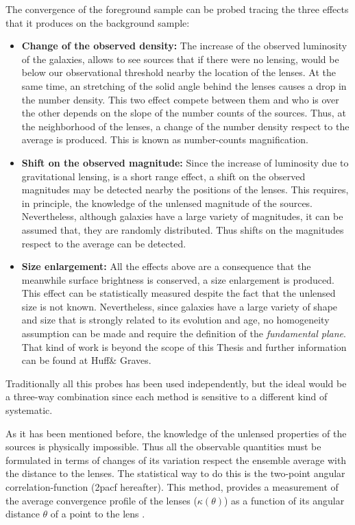 The convergence of the foreground sample can be probed tracing the three effects that it produces on the background sample:
\begin{itemize}
\item {\bf Change of the observed density:} The increase of the observed luminosity of the galaxies, allows to see sources that if there were no lensing, would be below our observational threshold nearby the location of the lenses. At the same time, an stretching of the solid angle behind the lenses causes a drop in the number density. This two effect compete between them and who is over the other depends on the slope of the number counts of the sources. Thus, at the neighborhood of the lenses, a change of the number density respect to the average is produced. This is known as number-counts magnification.
\item {\bf Shift on the observed magnitude:} Since the increase of luminosity due to gravitational lensing, is a short range effect, a shift on the observed magnitudes may be detected nearby the positions of the lenses. This requires, in principle, the knowledge of the unlensed magnitude of the sources. Nevertheless, although galaxies have a large variety of magnitudes, it can be assumed that, they are randomly distributed. Thus shifts on the magnitudes respect to the average can be detected.
\item {\bf Size enlargement:} All the effects above are a consequence that the meanwhile surface brightness is conserved, a size enlargement is produced. This effect can be statistically measured despite the fact that the unlensed size is not known. Nevertheless, since galaxies have a large variety of shape and size that is strongly related to its evolution and age, no homogeneity assumption can be made and require the definition of the {\it fundamental plane}. That kind of work is beyond the scope of this Thesis and further information can be found at Huff\& Graves.
\end{itemize}

Traditionally all this probes has been used independently, but the ideal would be a three-way combination since each method is sensitive to a different kind of systematic.
\newline

As it has been mentioned before, the knowledge of the unlensed properties of the sources is physically impossible. Thus all the observable quantities must be formulated in terms of changes of its variation respect the ensemble average with the distance to the lenses. The statistical way to do this is the two-point angular correlation-function (2pacf hereafter). This method, provides a measurement of the average convergence profile of the lenses ($\kappa(\theta)$) as a function of its angular distance $\theta$ of a point to the lens .

